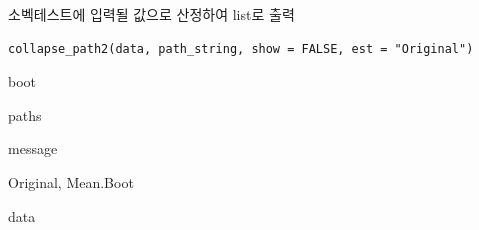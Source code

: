 \documentclass[a4paper]{book}
\begin{document}
%
\begin{Description}
소벡테스트에 입력될 값으로 산정하여 list로 출력
\end{Description}
%
\begin{Usage}
\begin{verbatim}
collapse_path2(data, path_string, show = FALSE, est = "Original")
\end{verbatim}
\end{Usage}
%
\begin{Arguments}
\begin{ldescription}
\item[\code{data}] boot

\item[\code{path\_string}] paths

\item[\code{show}] message

\item[\code{est}] Original, Mean.Boot
\end{ldescription}
\end{Arguments}
%
\begin{Value}
data
\end{Value}
%
\end{document}
